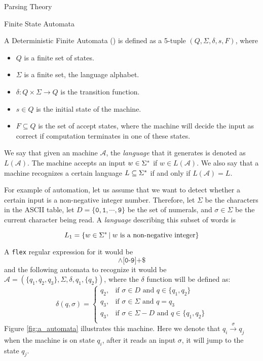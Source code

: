 \begin{section}{Parsing Theory}
\begin{subsection}{Finite State Automata}
\begin{definition}
A Deterministic Finite Automata () is defined as a 5-tuple
$(Q, \Sigma, \delta, s, F)$, where
\begin{itemize}

\item $Q$ is a finite set of states.
\item $\Sigma$ is a finite set, the language alphabet.
\item $\delta:Q\times\Sigma \longrightarrow Q$ is the transition function.
\item $s \in Q$ is the initial state of the machine.
\item $F \subseteq Q$ is the set of accept states, where the machine will
decide the input as correct if computation terminates in one of these
states.
\end{itemize}
\end{definition}

We say that given an machine $\mathcal{A}$, the \textit{language}
that it generates is denoted as $L(\mathcal{A})$. The machine accepts an input
$w \in \Sigma^*$ if $w \in L(\mathcal{A})$. We also say that a machine
recognizes a certain language $L \subseteq \Sigma^*$ if and only if
$L(\mathcal{A}) = L$.

For example of automation, let us assume that we want to detect whether a
certain input is a non-negative integer number. Therefore, let $\Sigma$ be the
characters in the ASCII table, let $D = \{\texttt{0}, \texttt{1}, \cdots,
\texttt{9}\}$ be the set of numerals, and $\sigma \in \Sigma$ be the current
character being read. A \textit{language} describing this subset of words
is

$$ L_1 = \{w \in \Sigma^*\,|\;w \text{ is a non-negative integer}\}$$

A \texttt{flex} regular expression for it would be
$$\land\texttt{[0-9]+\$}$$
and the following automata to recognize it would be
$\mathcal{A} = (\{q_1, q_2, q_3\}, \Sigma, \delta, q_1, \{q_2\})$, where
the $\delta$ function will be defined as:
	\[
		\delta(q, \sigma) = \begin{cases}
		  q_2,& \text{if } \sigma \in D \text{ and } q \in \{q_1, q_2\} \\
		  q_3,& \text{if } \sigma \in \Sigma \text{ and } q = q_3 \\
		  q_3,& \text{if } \sigma \in \Sigma - D \text{ and } q \in \{q_1, q_2\} \\
		\end{cases} \nonumber
	\]
Figure \ref{fig:a_automata} illustrates this machine. Here we denote that
$q_i \overset{\sigma}{\longrightarrow} q_j$ when the machine is on state
$q_i$, after it reads an input $\sigma$, it will jump to the state $q_j$.


\end{subsection}
\end{section}
